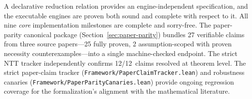 \documentclass[]{article}
\newcommand{\code}[1]{\texttt{#1}}
\begin{document}
A declarative reduction relation provides an engine-independent specification,
and the executable engines are proven both sound and complete with respect to it.
All nine \emph{core} implementation milestones are complete and sorry-free.
The paper-parity canonical package (Section~\ref{sec:paper-parity}) bundles
27 verifiable claims from three source papers---25 fully proven, 2
assumption-scoped with proven necessity counterexamples---into a single
machine-checked endpoint.  The strict NTT tracker independently confirms
12/12~claims resolved at theorem level.  The strict paper-claim tracker
(\code{Framework/PaperClaimTracker.lean}) and robustness canaries
(\code{Framework/PaperParityCanaries.lean}) provide ongoing regression
coverage for the formalization's alignment with the mathematical literature.



\end{document}
